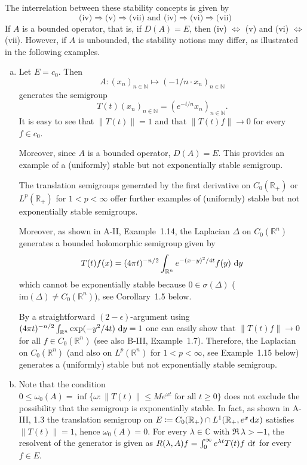 The interrelation between these stability concepts is given by
\[
\text{(iv)} \Rightarrow \text{(v)} \Rightarrow \text{(vii)} \text{ and } \text{(iv)} \Rightarrow \text{(vi)} \Rightarrow \text{(vii)}
\]
If $A$ is a bounded operator, that is, if $D(A) = E$, then (iv) $\Leftrightarrow$ (v) and (vi) $\Leftrightarrow$ (vii).
However, if $A$ is unbounded, the stability notions may differ, as illustrated in the following examples.
\begin{example}\label{ex:a4-1.2}
\begin{enumerate}[(a), wide, labelsep=1em, itemindent=\parindent]

\item 
Let $E = c_{0}$. 
Then 
\[
A \colon (x_{n})_{n \in \mathbb{N}} \mapsto (-1/n \cdot x_{n})_{n \in \mathbb{N}}
\] 
generates the semigroup 
\[
T(t)(x_{n})_{n \in \mathbb{N}} = (e^{-t/n} x_{n})_{n \in \mathbb{N}}.
\]
It is easy to see that $\|T(t)\|=1$ and that $\|T(t)f\|\to 0$ for every $f \in c_{0}$.

Moreover, since $A$ is a bounded operator, $D(A) = E$.
This provides an example of a (uniformly) stable but not exponentially stable semigroup.

The translation semigroups generated by the first derivative on $C_0(\mathbb{R}_{+})$ or $L^{p}(\mathbb{R}_{+})$ for $1 < p < \infty$ offer further examples of (uniformly) stable but not exponentially stable semigroups.

Moreover, as shown in A-II, Example~1.14, the Laplacian $\Delta$ on $C_0(\mathbb{R}^{n})$ generates a bounded holomorphic semigroup given by
\[
T(t)f(x) = (4\pi t)^{-n/2} \int_{\mathbb{R}^{n}} e^{-(x-y)^{2}/4t} f(y) \,\mathop{}\!\mathrm{d}{y}
\]
which cannot be exponentially stable because $0 \in \sigma(\Delta)$ ($\text{im}(\Delta) \not= C_0(\mathbb{R}^{n})$), see Corollary~1.5 below.

By a straightforward $(2-\epsilon)$-argument using $(4\pi t)^{-n/2}\int_{\mathbb{R}^{n}} \exp(-y^{2}/4t) \,\mathop{}\!\mathrm{d}{y} = 1$ one can easily show that $\|T(t)f\| \to 0$ for all $f \in C_0(\mathbb{R}^{n})$ (see also B-III, Example~1.7).
Therefore, the Laplacian on $C_0(\mathbb{R}^{n})$ (and also on $L^{p}(\mathbb{R}^{n})$ for $1 < p < \infty$, see Example~1.15 below) generates a (uniformly) stable but not exponentially stable semigroup.

\item 
Note that the condition $0 \leq \omega_0(A) = \inf\{\omega : \|T(t)\| \leq Me^{\omega t} \text{ for all } t \geq 0\}$ does not exclude the possibility that the semigroup is exponentially stable.
In fact, as shown in A-III, 1.3 the translation semigroup on $E \coloneqq C_0(\mathbb{R}_{+}) \cap L^{1}(\mathbb{R}_{+},e^{x}\mathop{}\!\mathrm{d}{x})$ satisfies $\|T(t)\| = 1$, hence $\omega_0(A) = 0$. 
For every $\lambda \in \mathbb{C}$ with $\Re\,\lambda > -1$, the resolvent of the generator is given as $R(\lambda,A)f = \int_{0}^{\infty} e^{\lambda t} T(t)f \,\mathop{}\!\mathrm{d}{t}$ for every $f \in E$.


\end{enumerate}
\end{example}
